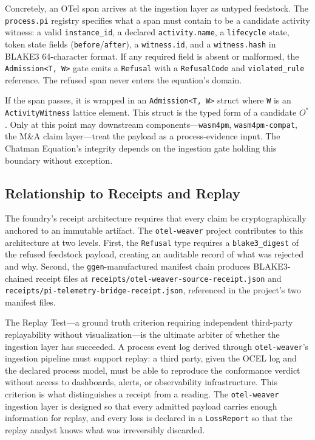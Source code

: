 Concretely, an OTel span arrives at the ingestion layer as untyped feedstock. The
\texttt{process.pi} registry specifies what a span must contain to be a candidate activity
witness: a valid \texttt{instance\_id}, a declared \texttt{activity.name}, a \texttt{lifecycle}
state, token state fields (\texttt{before}/\texttt{after}), a \texttt{witness.id}, and a
\texttt{witness.hash} in BLAKE3 64-character format. If any required field is absent or malformed,
the \texttt{Admission<T,\,W>} gate emits a \texttt{Refusal} with a \texttt{RefusalCode} and
\texttt{violated\_rule} reference. The refused span never enters the equation's domain.

If the span passes, it is wrapped in an \texttt{Admission<T,\,W>} struct where \texttt{W} is an
\texttt{ActivityWitness} lattice element. This struct is the typed form of a candidate $O^*$. Only
at this point may downstream components---\texttt{wasm4pm}, \texttt{wasm4pm-compat}, the M\&A
claim layer---treat the payload as a process-evidence input. The Chatman Equation's integrity
depends on the ingestion gate holding this boundary without exception.

\subsection{Relationship to Receipts and Replay}
\label{sec:otel-weaver-lineage-receipts}

The foundry's receipt architecture requires that every claim be cryptographically anchored to an
immutable artifact. The \texttt{otel-weaver} project contributes to this architecture at two
levels. First, the \texttt{Refusal} type requires a \texttt{blake3\_digest} of the refused
feedstock payload, creating an auditable record of what was rejected and why. Second, the
\texttt{ggen}-manufactured manifest chain produces BLAKE3-chained receipt files at
\texttt{receipts/otel-weaver-source-receipt.json} and \texttt{receipts/pi-telemetry-bridge-receipt.json},
referenced in the project's two manifest files.

The Replay Test---a ground truth criterion requiring independent third-party replayability without
visualization---is the ultimate arbiter of whether the ingestion layer has succeeded. A process
event log derived through \texttt{otel-weaver}'s ingestion pipeline must support replay: a third
party, given the OCEL log and the declared process model, must be able to reproduce the conformance
verdict without access to dashboards, alerts, or observability infrastructure. This criterion is
what distinguishes a receipt from a reading. The \texttt{otel-weaver} ingestion layer is designed
so that every admitted payload carries enough information for replay, and every loss is declared
in a \texttt{LossReport} so that the replay analyst knows what was irreversibly discarded.

